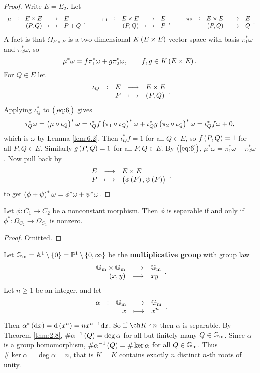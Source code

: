 \begin{proof}
Write $ E = E_2 $. Let
$$ \function[\mu]{E \times E}{E}{\br{P, Q}}{P + Q}, \qquad \function[\pi_1]{E \times E}{E}{\br{P, Q}}{P}, \qquad \function[\pi_2]{E \times E}{E}{\br{P, Q}}{Q}. $$
A fact is that $ \Omega_{E \times E} $ is a two-dimensional $ K\br{E \times E} $-vector space with basis $ \pi_1^*\omega $ and $ \pi_2^*\omega $, so
\begin{equation}
\label{eq:6}
\mu^*\omega = f\pi_1^*\omega + g\pi_2^*\omega, \qquad f, g \in K\br{E \times E}.
\end{equation}
For $ Q \in E $ let
$$ \function[\iota_Q]{E}{E \times E}{P}{\br{P, Q}}. $$
Applying $ \iota_Q^* $ to $ \br{\ref{eq:6}} $ gives
$$ \tau_Q^*\omega = \br{\mu \circ \iota_Q}^*\omega = \iota_Q^*f\br{\pi_1 \circ \iota_Q}^*\omega + \iota_Q^*g\br{\pi_2 \circ \iota_Q}^*\omega = \iota_Q^*f\omega + 0, $$
which is $ \omega $ by Lemma \ref{lem:6.2}. Then $ \iota_Q^*f = 1 $ for all $ Q \in E $, so $ f\br{P, Q} = 1 $ for all $ P, Q \in E $. Similarly $ g\br{P, Q} = 1 $ for all $ P, Q \in E $. By $ \br{\ref{eq:6}} $, $ \mu^*\omega = \pi_1^*\omega + \pi_2^*\omega $. Now pull back by
$$ \function{E}{E \times E}{P}{\br{\phi\br{P}, \psi\br{P}}}, $$
to get $ \br{\phi + \psi}^*\omega = \phi^*\omega + \psi^*\omega $.
\end{proof}

\pagebreak

\begin{lemma}
Let $ \phi : C_1 \to C_2 $ be a nonconstant morphism. Then $ \phi $ is separable if and only if $ \phi^* : \Omega_{C_2} \to \Omega_{C_1} $ is nonzero.
\end{lemma}

\begin{proof}
Omitted.
\end{proof}


\begin{example*}
Let $ \GG_\m = \AA^1 \setminus \cbr{0} = \PP^1 \setminus \cbr{0, \infty} $ be the \textbf{multiplicative group} with group law
$$ \function{\GG_\m \times \GG_\m}{\GG_\m}{\br{x, y}}{xy}. $$
Let $ n \ge 1 $ be an integer, and let
$$ \function[\alpha]{\GG_\m}{\GG_\m}{x}{x^n}. $$
Then $ \alpha^*\br{\d x} = \d\br{x^n} = nx^{n - 1}\d x $. So if $ \ch K \nmid n $ then $ \alpha $ is separable. By Theorem \ref{thm:2.8}, $ \#\alpha^{-1}\br{Q} = \deg \alpha $ for all but finitely many $ Q \in \mathbb{G}_{\mathrm{m}} $. Since $ \alpha $ is a group homomorphism, $ \#\alpha^{-1}\br{Q} = \#\ker \alpha $ for all $ Q \in \mathbb{G}_{\mathrm{m}} $. Thus $ \#\ker \alpha = \deg \alpha = n $, that is $ K = \overline{K} $ contains exactly $ n $ distinct $ n $-th roots of unity.
\end{example*}

